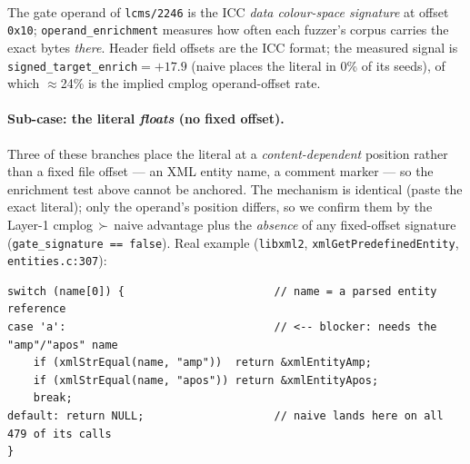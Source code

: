 \documentclass[11pt]{article}
\begin{document}
\begin{center}
\\[2pt]
{\footnotesize The gate operand of \texttt{lcms/2246} is the ICC \emph{data colour-space
signature} at offset \texttt{0x10}; \texttt{operand\_enrichment} measures how often each
fuzzer's corpus carries the exact bytes \emph{there}. Header field offsets are the ICC
format; the measured signal is \texttt{signed\_target\_enrich}$=+17.9$ (naive places the
literal in 0\% of its seeds), of which $\approx$24\% is the implied cmplog operand-offset rate.}
\end{center}

\paragraph{Sub-case: the literal \emph{floats} (no fixed offset).} Three of these
branches place the literal at a \emph{content-dependent} position rather than a
fixed file offset --- an XML entity name, a comment marker --- so the enrichment
test above cannot be anchored. The mechanism is identical (paste the exact
literal); only the operand's position differs, so we confirm them by the Layer-1
\mbox{cmplog\,$\succ$\,naive} advantage plus the \emph{absence} of any fixed-offset
signature (\texttt{gate\_signature == false}). Real example
(\texttt{libxml2}, \texttt{xmlGetPredefinedEntity}, \texttt{entities.c:307}):

\begin{lstlisting}[style=c]
switch (name[0]) {                       // name = a parsed entity reference
case 'a':                                // <-- blocker: needs the "amp"/"apos" name
    if (xmlStrEqual(name, "amp"))  return &xmlEntityAmp;
    if (xmlStrEqual(name, "apos")) return &xmlEntityApos;
    break;
default: return NULL;                    // naive lands here on all 479 of its calls
}
\end{lstlisting}
\end{document}
